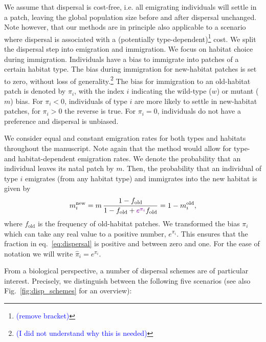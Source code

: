 \documentclass[a4paper,11pt]{article}
\newcommand{\francois}[1]{\textcolor{blue}{(#1)}}
\newcommand{\chg}[1]{\textcolor{change}{#1}}
\begin{document}
We assume that dispersal is cost-free, i.e. all emigrating individuals will settle in a patch, leaving the global population size before and after dispersal unchanged. \chg{Note however, that our methods are in principle also applicable to a scenario where dispersal is associated with a (potentially type-dependent)\footnote{\francois{remove bracket}} cost.} We split the dispersal step into emigration and immigration. We focus on habitat choice during immigration. Individuals have a bias to immigrate into patches of a certain habitat type. The bias \chg{during} immigration \chg{for} new-habitat patches is set to \chg{zero}, without loss of generality.\footnote{\francois{I did not understand why this is needed}} The bias \chg{for immigration to} an old-habitat patch is denoted by $\pi_{i}$, with the index $i$ indicating the wild-type ($w$) or mutant ($m$) bias. For \chg{$\pi_i<0$}, individuals of type $i$ are more likely to settle in new-habitat patches, for \chg{$\pi_i>0$} the reverse is true. For $\pi_i=0$, individuals do not have a preference and dispersal is \chg{unbiased}.

We consider equal and constant emigration rates for both types and habitats throughout the manuscript. Note again that the method would allow for type- and habitat-dependent emigration rates. We denote the probability \chg{that an individual leaves} its natal patch by $m$. 
Then, the probability \chg{that an individual of type $i$} \chg{emigrates (from any habitat type) and immigrates into }the new habitat is given by 
\begin{equation}\label{eq:dispersal}
	\begin{aligned}
		m_i^{\text{new}} &= m\, \frac{1-f_{\text{old}}}{1-f_{\text{old}}+\chg{e^{\pi_i}} f_{\text{old}}} = 1-m_i^{\text{old}},\\
	\end{aligned}
\end{equation}
where $f_{\text{old}}$ is the frequency of old-habitat patches. \chg{
We transformed the bias $\pi_i$ which can take any real value to a positive number, $e^{\pi_i}$. This ensures that the fraction in eq.~\eqref{eq:dispersal} is positive and between zero and one. For the ease of notation we will write $\widehat{\pi}_i=e^{\pi_i}$.}

From a biological perspective, a number of dispersal schemes are of particular interest. Precisely, we distinguish between the following five scenarios (see also Fig.~\ref{fig:disp_schemes} for an overview):
\end{document}
